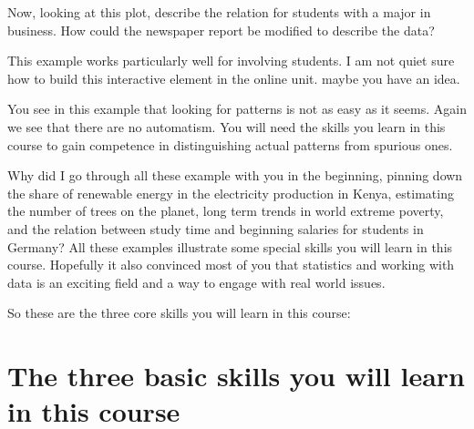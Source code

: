 \documentclass[
  letterpaper,
]{scrbook}
\begin{document}
Now, looking at this plot, describe the relation for students with a
major in business. How could the newspaper report be modified to
describe the data?

\begin{tcolorbox}[enhanced jigsaw, toprule=.15mm, colbacktitle=quarto-callout-caution-color!10!white, breakable, coltitle=black, rightrule=.15mm, bottomtitle=1mm, bottomrule=.15mm, titlerule=0mm, title=\textcolor{quarto-callout-caution-color}{\faFire}\hspace{0.5em}{Comment for Seitwerk}, arc=.35mm, leftrule=.75mm, toptitle=1mm, left=2mm, opacityback=0, opacitybacktitle=0.6, colframe=quarto-callout-caution-color-frame, colback=white]
This example works particularly well for involving students. I am not
quiet sure how to build this interactive element in the online unit.
maybe you have an idea.
\end{tcolorbox}

You see in this example that looking for patterns is not as easy as it
seems. Again we see that there are no automatism. You will need the
skills you learn in this course to gain competence in distinguishing
actual patterns from spurious ones.

Why did I go through all these example with you in the beginning,
pinning down the share of renewable energy in the electricity production
in Kenya, estimating the number of trees on the planet, long term trends
in world extreme poverty, and the relation between study time and
beginning salaries for students in Germany? All these examples
illustrate some special skills you will learn in this course. Hopefully
it also convinced most of you that statistics and working with data is
an exciting field and a way to engage with real world issues.

So these are the three core skills you will learn in this course:

\hypertarget{the-three-basic-skills-you-will-learn-in-this-course}{%
\section{The three basic skills you will learn in this
course}\label{the-three-basic-skills-you-will-learn-in-this-course}}
\end{document}
